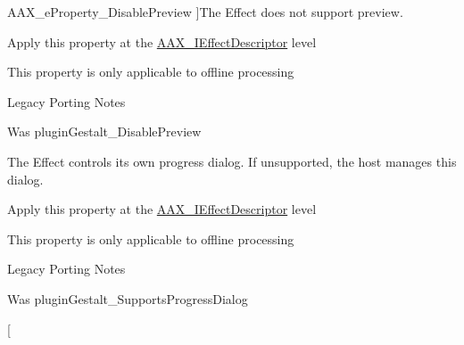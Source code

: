 \begin{Desc}
\begin{description}
{\hypertarget{a00283_a6571f4e41a5dd06e4067249228e2249ea854fdc19ab908b67aa3bc1f4262aa288}{}A\+A\+X\+\_\+e\+Property\+\_\+\+Disable\+Preview\label{a00283_a6571f4e41a5dd06e4067249228e2249ea854fdc19ab908b67aa3bc1f4262aa288}
}]The Effect does not support preview. \begin{DoxyItemize}
\item Apply this property at the \hyperlink{a00096}{A\+A\+X\+\_\+\+I\+Effect\+Descriptor} level \item This property is only applicable to offline processing\end{DoxyItemize}
\begin{DoxyRefDesc}{Legacy Porting Notes}
\item[\hyperlink{a00384__porting_notes000055}{Legacy Porting Notes}]Was plugin\+Gestalt\+\_\+\+Disable\+Preview \end{DoxyRefDesc}
\item[{\em 
\hypertarget{a00283_a6571f4e41a5dd06e4067249228e2249eab9a9782ae1aed57b2f2cd6acd1081b38}{}A\+A\+X\+\_\+e\+Property\+\_\+\+Supports\+Progress\+Dialog\label{a00283_a6571f4e41a5dd06e4067249228e2249eab9a9782ae1aed57b2f2cd6acd1081b38}
}]The Effect controls its own progress dialog. If unsupported, the host manages this dialog. \begin{DoxyItemize}
\item Apply this property at the \hyperlink{a00096}{A\+A\+X\+\_\+\+I\+Effect\+Descriptor} level \item This property is only applicable to offline processing\end{DoxyItemize}
\begin{DoxyRefDesc}{Legacy Porting Notes}
\item[\hyperlink{a00384__porting_notes000056}{Legacy Porting Notes}]Was plugin\+Gestalt\+\_\+\+Supports\+Progress\+Dialog \end{DoxyRefDesc}
\item[{\em 
}
\end{description}
\end{Desc}
